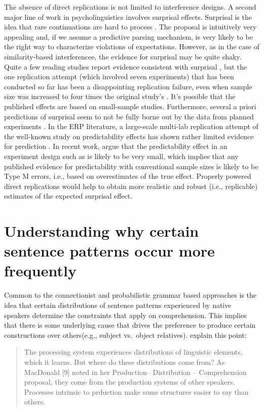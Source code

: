 \documentclass{cambridge7A}\usepackage[]{graphicx}\usepackage[]{color}
\begin{document}
The absence of direct replications is not limited to interference designs. A second major line of work in psycholinguistics involves surprisal effects. Surprisal is the idea that rare continuations are hard to process \citep{Hale2001,Levy2008}. The proposal is intuitively very appealing and, if we assume a predictive parsing mechanism, is very likely to be the right way to characterize violations of expectations. However, as in the case of similarity-based interferencee, the evidence for surprisal may be quite shaky. Quite a few reading studies report evidence consistent  with surprisal \citep[e.g.,][]{Konieczny2000,konieczny2003anticipation,jemrsurprisal,VasishthLewis2006,DembergKeller2008,BostonHaleVasishth2011,LevyKeller2013,levyfedgibsonRussian,JagerChenLi2015,linzenuncertainty,WuKaiserVasishth2017}, but the one replication attempt (which involved seven experiments) that has been conducted so far has been a disappointing replication failure, even when sample size was increased to four times the original study's \citep{VasishthMertzenJaegerGelman2018}. It's possible that the published effects are based on small-sample studies. Furthermore, several a priori predictions of surprisal seem to not be fully borne out by the data from planned experiments \citep{HusainVasishthSrinivasan2014,levyfedgibsonRussian,SafaviEtAlFrontiers2016}. In the ERP literature, a large-scale multi-lab replication attempt of the well-known \cite{DeLongUrbachKutas2005} study on predictability effects has shown rather limited evidence for prediction \citep{nieuwland2017limits}. In recent work, \cite{NicenboimPreactivation2019} argue that the predictability effect in an experiment design such as \cite{DeLongUrbachKutas2005}  is likely to be very small, which implies that any published evidence for predictability with conventional sample sizes is likely to be Type M errors, i.e., based on overestimates of the  true effect. Properly powered direct replications would help to obtain more realistic and robust (i.e., replicable) estimates of the expected surprisal effect.


\section{Understanding why certain sentence patterns occur more frequently}

Common to the connectionist and probabilistic grammar based approaches is the idea that certain distributions of sentence patterns experienced by native speakers determine the constraints that apply on comprehension. This implies that there is some underlying cause that drives the preference to produce certain constructions over others(e.g., subject vs.\ object relatives). 
\cite{dellchang14}  explain this point:
\begin{quote}
The processing system experiences distributions of linguistic elements, which it learns. But where do these distributions come from? As MacDonald [9] noted in her Production– Distribution – Comprehension proposal, they come from the production systems of other speakers. Processes intrinsic to prduction make some structures easier to say than others.
\end{quote}
\end{document}
